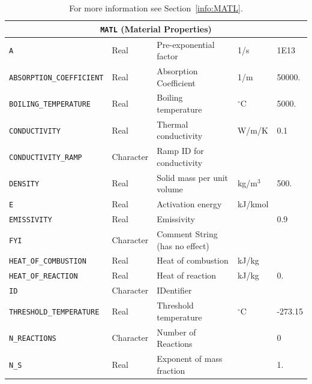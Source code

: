 \documentclass[11pt]{book}
\newcommand{\ct}{\tt\small}
\begin{document}
\begin{table}[H]
\caption{For more information see Section~\ref{info:MATL}.}\label{tbl:MATL}
\noindent
\begin{tabular*}{\textwidth}{@{\extracolsep{\fill}}|l|l|l|l|l|}
\hline
\multicolumn{5}{|c|}{{\ct MATL} (Material Properties)} \\ \hline \hline
{\ct A}                       & Real        & Pre-exponential factor         &    1/s           & 1E13   \\ \hline
{\ct ABSORPTION\_COEFFICIENT} & Real        & Absorption Coefficient         &    1/m           & 50000. \\ \hline
{\ct BOILING\_TEMPERATURE}    & Real        & Boiling temperature            & $^\circ$C        & 5000.  \\ \hline
{\ct CONDUCTIVITY}            & Real        & Thermal conductivity           & W/m/K            & 0.1    \\ \hline
{\ct CONDUCTIVITY\_RAMP}      & Character   & Ramp ID for conductivity       &                  &        \\ \hline
{\ct DENSITY}                 & Real        & Solid mass per unit volume     & kg/m$^3$         & 500.   \\ \hline
{\ct E}                       & Real        & Activation energy              & kJ/kmol          &        \\ \hline
{\ct EMISSIVITY    }          & Real        & Emissivity                     &                  & 0.9    \\ \hline
{\ct FYI}                     & Character   & Comment String (has no effect) &                  &        \\ \hline
{\ct HEAT\_OF\_COMBUSTION}    & Real        & Heat of combustion             & kJ/kg            &        \\ \hline
{\ct HEAT\_OF\_REACTION}      & Real        & Heat of reaction               & kJ/kg            & 0.     \\ \hline
{\ct ID     }                 & Character   & IDentifier                     &                  &        \\ \hline
{\ct THRESHOLD\_TEMPERATURE}  & Real        & Threshold temperature          & $^\circ$C        & -273.15 \\ \hline
{\ct N\_REACTIONS}            & Character   & Number of Reactions            &                  & 0      \\ \hline
{\ct N\_S}                    & Real        & Exponent of mass fraction      &                  & 1.     \\ \hline

\end{tabular*}
\end{table}
\end{document}
